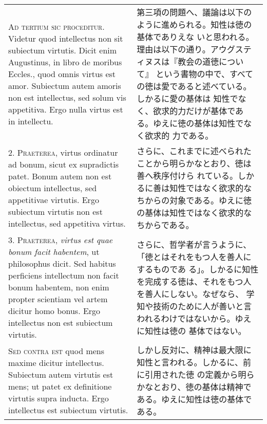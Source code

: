 \documentclass[10pt]{jsarticle}
\begin{document}
\begin{longtable}{p{21em}p{21em}}
{\scshape Ad tertium sic proceditur}. Videtur quod intellectus non sit
subiectum virtutis. Dicit enim Augustinus, in libro de moribus
Eccles., quod omnis virtus est amor. Subiectum autem amoris non est
intellectus, sed solum vis appetitiva. Ergo nulla virtus est in
intellectu.

&

第三項の問題へ、議論は以下のように進められる。知性は徳の基体でありえな
いと思われる。理由は以下の通り。アウグスティヌスは『教会の道徳について』
という書物の中で、すべての徳は愛であると述べている。しかるに愛の基体は
知性でなく、欲求的力だけが基体である。ゆえに徳の基体は知性でなく欲求的
力である。

\\

2. {\scshape Praeterea}, virtus ordinatur ad bonum, sicut ex supradictis
patet. Bonum autem non est obiectum intellectus, sed appetitivae
virtutis. Ergo subiectum virtutis non est intellectus, sed appetitiva
virtus.

&

さらに、これまでに述べられたことから明らかなとおり、徳は善へ秩序付けら
れている。しかるに善は知性ではなく欲求的なちからの対象である。ゆえに徳
の基体は知性ではなく欲求的なちからである。

\\

3. {\scshape Praeterea}, {\itshape virtus est quae bonum facit
habentem}, ut philosophus dicit. Sed habitus perficiens intellectum
non facit bonum habentem, non enim propter scientiam vel artem dicitur
homo bonus. Ergo intellectus non est subiectum virtutis.

&

さらに、哲学者が言うように、「徳とはそれをもつ人を善人にするものであ
る」。しかるに知性を完成する徳は、それをもつ人を善人にしない。なぜなら、
学知や技術のために人が善いと言われるわけではないから。ゆえに知性は徳の
基体ではない。

\\

{\scshape Sed contra est} quod mens maxime dicitur
intellectus. Subiectum autem virtutis est mens; ut patet ex
definitione virtutis supra inducta. Ergo intellectus est subiectum
virtutis.

&

しかし反対に、精神は最大限に知性と言われる。しかるに、前に引用された徳
の定義から明らかなとおり、徳の基体は精神である。ゆえに知性は徳の基体で
ある。


\end{longtable}
\end{document}
